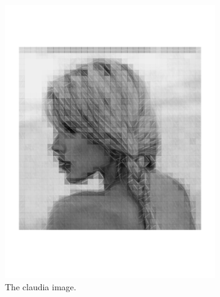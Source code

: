 \begin{figure}[h]
	\centering
	\begin{subfigure}[b]{0.47\textwidth}
		\includegraphics[trim=2cm 5cm 2cm 5cm, clip=true, width=\textwidth]{figures/directional_claudia}
		\caption{The claudia image.}
		\label{fig:claudia}
	\end{subfigure}
	\begin{subfigure}[b]{0.47\textwidth}

\end{subfigure}
\end{figure}
